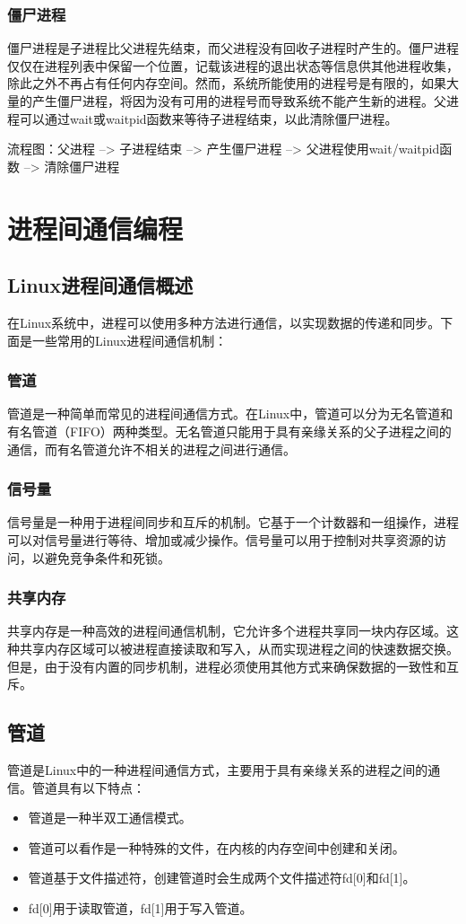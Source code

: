 \documentclass[12pt, a4paper, oneside]{ctexbook}
\numberwithin{figure}{section}
\begin{document}
\subsubsection{僵尸进程}
僵尸进程是子进程比父进程先结束，而父进程没有回收子进程时产生的。僵尸进程仅仅在进程列表中保留一个位置，记载该进程的退出状态等信息供其他进程收集，除此之外不再占有任何内存空间。然而，系统所能使用的进程号是有限的，如果大量的产生僵尸进程，将因为没有可用的进程号而导致系统不能产生新的进程。父进程可以通过wait或waitpid函数来等待子进程结束，以此清除僵尸进程。

流程图：父进程 --> 子进程结束 --> 产生僵尸进程 --> 父进程使用wait/waitpid函数 --> 清除僵尸进程

\section{进程间通信编程}

\subsection{Linux进程间通信概述}
在Linux系统中，进程可以使用多种方法进行通信，以实现数据的传递和同步。下面是一些常用的Linux进程间通信机制：

\subsubsection{管道}
管道是一种简单而常见的进程间通信方式。在Linux中，管道可以分为无名管道和有名管道（FIFO）两种类型。无名管道只能用于具有亲缘关系的父子进程之间的通信，而有名管道允许不相关的进程之间进行通信。

\subsubsection{信号量}
信号量是一种用于进程间同步和互斥的机制。它基于一个计数器和一组操作，进程可以对信号量进行等待、增加或减少操作。信号量可以用于控制对共享资源的访问，以避免竞争条件和死锁。

\subsubsection{共享内存}
共享内存是一种高效的进程间通信机制，它允许多个进程共享同一块内存区域。这种共享内存区域可以被进程直接读取和写入，从而实现进程之间的快速数据交换。但是，由于没有内置的同步机制，进程必须使用其他方式来确保数据的一致性和互斥。

\subsection{管道}
管道是Linux中的一种进程间通信方式，主要用于具有亲缘关系的进程之间的通信。管道具有以下特点：
\begin{itemize}
    \item 管道是一种半双工通信模式。
    \item 管道可以看作是一种特殊的文件，在内核的内存空间中创建和关闭。
    \item 管道基于文件描述符，创建管道时会生成两个文件描述符fd[0]和fd[1]。
    \item fd[0]用于读取管道，fd[1]用于写入管道。
\end{itemize}
\end{document}
